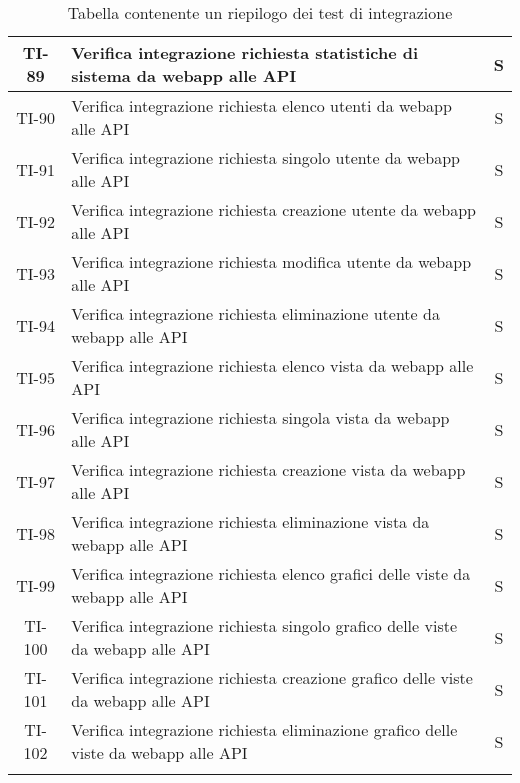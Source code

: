 \begin{center}
\begin{longtable}{|c|p{12cm}|c|}
			\hline
			TI-89 & Verifica integrazione richiesta statistiche di sistema da webapp alle API & S \\
			\hline
			TI-90 & Verifica integrazione richiesta elenco utenti da webapp alle API & S \\
			\hline
			TI-91 & Verifica integrazione richiesta singolo utente da webapp alle API & S \\
			\hline
			TI-92 & Verifica integrazione richiesta creazione utente da webapp alle API & S \\
			\hline
			TI-93 & Verifica integrazione richiesta modifica utente da webapp alle API & S \\
			\hline
			TI-94 & Verifica integrazione richiesta eliminazione utente da webapp alle API & S \\
			\hline
			TI-95 & Verifica integrazione richiesta elenco vista da webapp alle API & S \\
			\hline
			TI-96 & Verifica integrazione richiesta singola vista da webapp alle API & S \\
			\hline
			TI-97 & Verifica integrazione richiesta creazione vista da webapp alle API & S \\
			\hline
			TI-98 & Verifica integrazione richiesta eliminazione vista da webapp alle API & S \\
			\hline
			TI-99 & Verifica integrazione richiesta elenco grafici delle viste da webapp alle API & S \\
			\hline
			TI-100 & Verifica integrazione richiesta singolo grafico delle viste da webapp alle API & S \\
			\hline
			TI-101 & Verifica integrazione richiesta creazione grafico delle viste da webapp alle API & S \\
			\hline
			TI-102 & Verifica integrazione richiesta eliminazione grafico delle viste da webapp alle API & S \\
			\hline
			 
			\caption{Tabella contenente un riepilogo dei test di integrazione}
			\end{longtable}
		\end{center}
	
